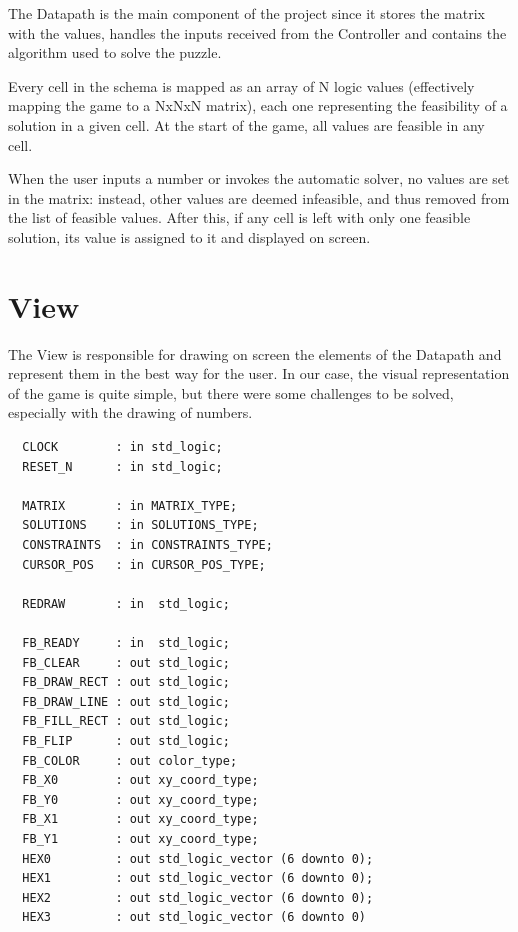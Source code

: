\documentclass[12pt]{report}
\begin{document}
The Datapath is the main component of the project since it stores the
matrix with the values, handles the inputs received from the Controller
and contains the algorithm used to solve the puzzle.

Every cell in the schema is mapped as an array of N logic values (effectively
mapping the game to a NxNxN matrix), each one representing the feasibility of
a solution in a given cell. At the start of the game, all values are feasible
in any cell.

When the user inputs a number or invokes the automatic solver, no values are
set in the matrix: instead, other values are deemed infeasible, and thus
removed from the list of feasible values. After this, if any cell is left with
only one feasible solution, its value is assigned to it and displayed on
screen.

\newpage

\section*{View}

The View is responsible for drawing on screen the elements of the Datapath
and represent them in the best way for the user. In our case, the visual
representation of the game is quite simple, but there were some challenges
to be solved, especially with the drawing of numbers.

\begin{center}
\begin{minipage}{0.5\textwidth}
\begin{verbatim}
  CLOCK        : in std_logic;
  RESET_N      : in std_logic;

  MATRIX       : in MATRIX_TYPE;
  SOLUTIONS    : in SOLUTIONS_TYPE;
  CONSTRAINTS  : in CONSTRAINTS_TYPE;
  CURSOR_POS   : in CURSOR_POS_TYPE;

  REDRAW       : in  std_logic;

  FB_READY     : in  std_logic;
  FB_CLEAR     : out std_logic;
  FB_DRAW_RECT : out std_logic;
  FB_DRAW_LINE : out std_logic;
  FB_FILL_RECT : out std_logic;
  FB_FLIP      : out std_logic;
  FB_COLOR     : out color_type;
  FB_X0        : out xy_coord_type;
  FB_Y0        : out xy_coord_type;
  FB_X1        : out xy_coord_type;
  FB_Y1        : out xy_coord_type;
  HEX0         : out std_logic_vector (6 downto 0);
  HEX1         : out std_logic_vector (6 downto 0);
  HEX2         : out std_logic_vector (6 downto 0);
  HEX3         : out std_logic_vector (6 downto 0)
\end{verbatim}
\end{minipage}
\end{center}
\end{document}
